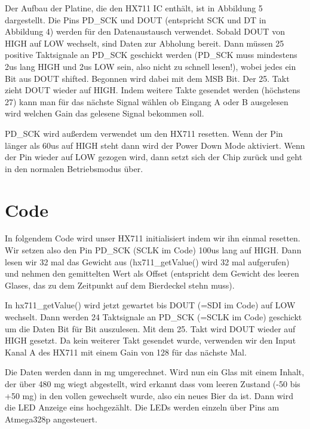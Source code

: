 \documentclass[12pt,journal,compsoc]{IEEEtran}
\begin{document}
Der Aufbau der Platine, die den  HX711 IC enthält, ist in Abbildung 5 dargestellt.
Die Pins PD\_SCK und DOUT (entspricht SCK und DT in Abbildung 4) werden für den Datenaustausch
verwendet. Sobald DOUT von HIGH auf LOW wechselt, sind Daten zur Abholung bereit.
Dann müssen 25 positive Taktsignale an PD\_SCK geschickt werden (PD\_SCK muss mindestens 2us lang
HIGH und 2us LOW sein, also nicht zu schnell lesen!), wobei jedes ein Bit aus DOUT shifted.
Begonnen wird dabei mit dem MSB Bit. Der 25. Takt zieht DOUT wieder auf HIGH.
Indem weitere Takte gesendet werden (höchstens 27) kann man für das nächste Signal wählen
ob Eingang A oder B ausgelesen wird welchen Gain das gelesene Signal bekommen soll. 

PD\_SCK wird außerdem verwendet um den HX711 resetten. Wenn der Pin länger als 60us auf HIGH
steht dann wird der Power Down Mode aktiviert. Wenn der Pin wieder auf LOW gezogen wird,
dann setzt sich der Chip zurück und geht in den normalen Betriebsmodus über.

\section{Code}

In folgendem Code wird unser HX711 initialisiert indem wir ihn einmal resetten.
Wir setzen also den Pin PD\_SCK (SCLK im Code) 100us lang auf HIGH. Dann lesen wir 32 mal das
Gewicht aus (hx711\_getValue() wird 32 mal aufgerufen) und nehmen den gemittelten Wert als
Offset (entspricht dem Gewicht des leeren Glases,
das zu dem Zeitpunkt auf dem Bierdeckel stehn muss).



In hx711\_getValue() wird jetzt gewartet bis DOUT (=SDI im Code) auf LOW wechselt.
Dann werden 24 Taktsignale an PD\_SCK (=SCLK im Code) geschickt um die Daten Bit für Bit auszulesen.
Mit dem 25. Takt wird DOUT wieder auf HIGH gesetzt. Da kein weiterer Takt gesendet wurde,
verwenden wir den Input Kanal A des HX711 mit einem Gain von 128 für das nächste Mal.



Die Daten werden dann in mg umgerechnet. Wird nun ein Glas mit einem Inhalt,
der über 480 mg wiegt abgestellt, wird erkannt dass vom leeren Zustand
(-50 bis +50 mg) in den vollen gewechselt wurde, also ein neues Bier da ist.
Dann wird die LED Anzeige eins hochgezählt. Die LEDs werden einzeln über Pins
am Atmega328p angesteuert.
\end{document}
